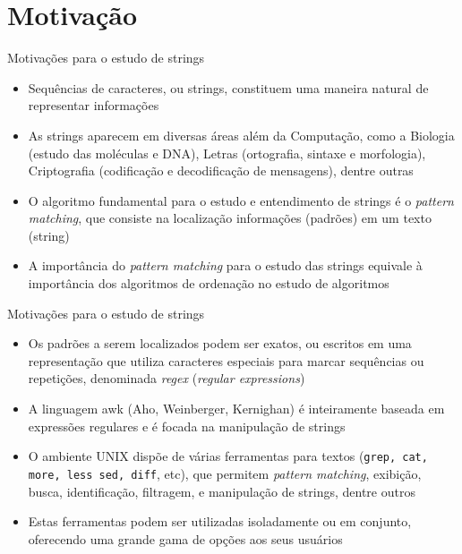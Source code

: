 \section{Motivação}

\begin{frame}[fragile]{Motivações para o estudo de strings}

    \begin{itemize}
        \item Sequências de caracteres, ou strings, constituem uma maneira natural de representar informações
        \pause

        \item As strings aparecem em diversas áreas além da Computação, como a Biologia (estudo das moléculas e DNA), Letras (ortografia, sintaxe e morfologia), Criptografia (codificação e decodificação de mensagens), dentre outras
        \pause

        \item O algoritmo fundamental para o estudo e entendimento de strings é o \textit{pattern 
        matching}, que consiste na localização informações (padrões) em um texto (string)
        \pause

        \item A importância do \textit{pattern matching} para o estudo das strings equivale à 
            importância dos algoritmos de ordenação no estudo de algoritmos

    \end{itemize}

\end{frame}

\begin{frame}[fragile]{Motivações para o estudo de strings}

    \begin{itemize}
        \item Os padrões a serem localizados podem ser exatos, ou escritos em uma representação 
            que utiliza caracteres especiais para marcar sequências ou repetições, denominada 
            \textit{regex} (\textit{regular expressions})
        \pause

        \item A linguagem awk (Aho, Weinberger, Kernighan) é inteiramente baseada em expressões 
            regulares e é focada na manipulação de strings
        \pause

        \item O ambiente UNIX dispõe de várias ferramentas para textos (\texttt{grep, cat, more, less sed, diff}, etc), que permitem \textit{pattern matching}, exibição, busca, identificação, filtragem, e manipulação de strings, dentre outros
        \pause

        \item Estas ferramentas podem ser utilizadas isoladamente ou em conjunto, oferecendo uma grande gama de opções aos seus usuários
    \end{itemize}

\end{frame}

